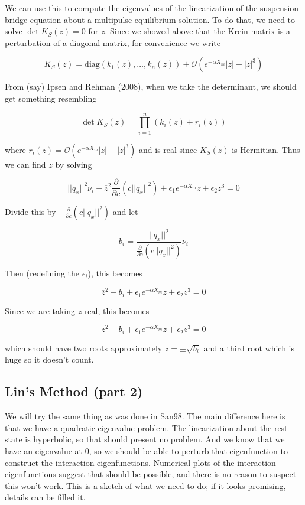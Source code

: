 \documentclass[12pt]{article}
\begin{document}
We can use this to compute the eigenvalues of the linearization of the suspension bridge equation about a multipulse equilibrium solution. To do that, we need to solve $\det K_S(z) = 0$ for $z$. Since we showed above that the Krein matrix is a perturbation of a diagonal matrix, for convenience we write

\[
K_S(z) = \text{diag}(k_1(z), \dots, k_n(z)) + \mathcal{O}(e^{-\alpha X_m}|z| + |z|^3)
\]

From (say) Ipsen and Rehman (2008), when we take the determinant, we should get something resembling

\[
\det K_S(z) = \prod_{i = 1}^n (k_i(z) + r_i(z))
\]

where $r_i(z) = \mathcal{O}(e^{-\alpha X_m}|z| + |z|^3)$ and is real since $K_S(z)$ is Hermitian. Thus we can find $z$ by solving

\[
||q_x||^2 \nu_i
 - \overline{z}^2 \frac{\partial}{\partial c} \left( c||q_x||^2 \right) + \epsilon_1 e^{-\alpha X_m} z + \epsilon_2 z^3 = 0
\]

Divide this by $-\frac{\partial}{\partial c} \left( c||q_x||^2 \right)$ and let

\[
b_i = \frac{||q_x||^2}{\frac{\partial}{\partial c} \left( c||q_x||^2 \right)} \nu_i
\]

Then (redefining the $\epsilon_i$), this becomes

\[
\overline{z}^2 - b_i + \epsilon_1 e^{-\alpha X_m} z + \epsilon_2 z^3 = 0
\]

Since we are taking $z$ real, this becomes

\[
z^2 - b_i + \epsilon_1 e^{-\alpha X_m} z + \epsilon_2 z^3 = 0
\]

which should have two roots approximately $z = \pm \sqrt{b_i}$ and a third root which is huge so it doesn't count.


\subsection{Lin's Method (part 2)}

We will try the same thing as was done in San98. The main difference here is that we have a quadratic eigenvalue problem. The linearization about the rest state is hyperbolic, so that should present no problem. And we know that we have an eigenvalue at 0, so we should be able to perturb that eigenfunction to construct the interaction eigenfunctions. Numerical plots of the interaction eigenfunctions suggest that should be possible, and there is no reason to suspect this won't work. This is a sketch of what we need to do; if it looks promising, details can be filled it.
\end{document}
